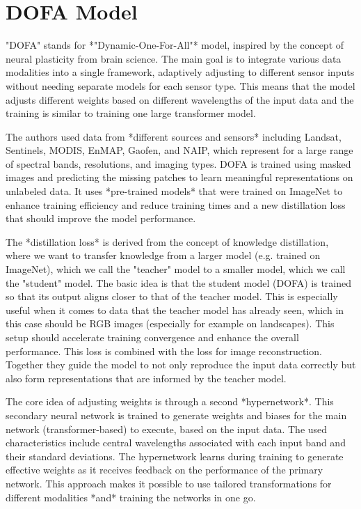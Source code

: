 
\section{DOFA Model}
\label{sec:dofa}

"DOFA" stands for *"Dynamic-One-For-All"* model, inspired by the concept of neural plasticity from brain science. The main goal is to integrate various data modalities into a single framework, adaptively adjusting to different sensor inputs without needing separate models for each sensor type. This means that the model adjusts different weights based on different wavelengths of the input data and the training is similar to training one large transformer model.

The authors used data from *different sources and sensors* including Landsat, Sentinels, MODIS, EnMAP, Gaofen, and NAIP, which represent for a large range of spectral bands, resolutions, and imaging types. DOFA is trained using masked images and predicting the missing patches to learn meaningful representations on unlabeled data. It uses *pre-trained models* that were trained on ImageNet to enhance training efficiency and reduce training times and a new distillation loss that should improve the model performance.

The *distillation loss* is derived from the concept of knowledge distillation, where we want to transfer knowledge from a larger model (e.g. trained on ImageNet), which we call the "teacher" model to a smaller model, which we call the "student" model. The basic idea is that the student model (DOFA) is trained so that its output aligns closer to that of the teacher model. This is especially useful when it comes to data that the teacher model has already seen, which in this case should be RGB images (especially for example on landscapes). This setup should accelerate training convergence and enhance the overall performance. This loss is combined with the loss for image reconstruction. Together they guide the model to not only reproduce the input data correctly but also form representations that are informed by the teacher model.

The core idea of adjusting weights is through a second *hypernetwork*. This secondary neural network is trained to generate weights and biases for the main network (transformer-based) to execute, based on the input data. The used characteristics include central wavelengths associated with each input band and their standard deviations. The hypernetwork learns during training to generate effective weights as it receives feedback on the performance of the primary network. This approach makes it possible to use tailored transformations for different modalities *and* training the networks in one go.

